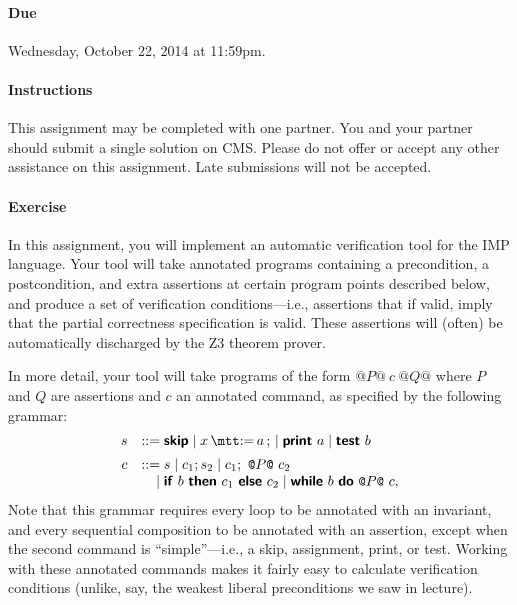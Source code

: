 \documentclass[11pt]{article}
\begin{document}

\vspace*{-1.25\bigskipamount}

\paragraph{Due} 
%
Wednesday, October 22, 2014 at 11:59pm.

\paragraph{Instructions} 
%
This assignment may be completed with one partner. 
You and your partner should submit a single solution on CMS. Please do
not offer or accept any other assistance on this assignment. Late
submissions will not be accepted.

\paragraph{Exercise}
%
In this assignment, you will implement an automatic verification tool
for the IMP language. Your tool will take annotated programs
containing a precondition, a postcondition, and extra assertions at
certain program points described below, and produce a set of
verification conditions---i.e., assertions that if valid, imply that
the partial correctness specification is valid. These assertions will
(often) be automatically discharged by the Z3 theorem prover.

In more detail, your tool will take programs of the form
$\texttt{@}P\texttt{@}~c~\texttt{@}Q\texttt{@}$ where $P$ and $Q$ are
assertions and $c$ an annotated command, as specified by the following
grammar:
\[
\begin{array}{rr@{\;}l}
s & ::=& \SKIP \mid \ASSGN{x}{a} \mid \impfnt{print}~a \mid \impfnt{test}~b\\[.5em]
c & ::=& s \mid c_1; s_2 \mid c_1;~\texttt{@} P \texttt{@}~c_2\\
& \mid & \IF~b~\THEN~c_1~\ELSE~c_2 \mid \WHILE~b~\DO~\texttt{@}P\texttt{@}~c,
\end{array}\]
%
Note that this grammar requires every loop to be annotated with an
invariant, and every sequential composition to be annotated with an
assertion, except when the second command is ``simple''---i.e., a
skip, assignment, print, or test. Working with these annotated
commands makes it fairly easy to calculate verification conditions
(unlike, say, the weakest liberal preconditions we saw in lecture).
\end{document}
